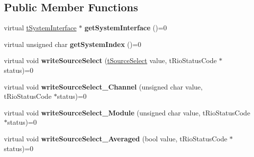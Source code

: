 \subsection*{Public Member Functions}
\begin{DoxyCompactItemize}
\item 
\hypertarget{classnFPGA_1_1nFRC__2012__1__6__4_1_1tAnalogTrigger_a314fa4ff3c023d2de8503a0b93340bd9}{
virtual \hyperlink{classnFPGA_1_1tSystemInterface}{tSystemInterface} $\ast$ {\bfseries getSystemInterface} ()=0}
\label{classnFPGA_1_1nFRC__2012__1__6__4_1_1tAnalogTrigger_a314fa4ff3c023d2de8503a0b93340bd9}

\item 
\hypertarget{classnFPGA_1_1nFRC__2012__1__6__4_1_1tAnalogTrigger_a52fd7aab1c07a98e846da8d71e36a84f}{
virtual unsigned char {\bfseries getSystemIndex} ()=0}
\label{classnFPGA_1_1nFRC__2012__1__6__4_1_1tAnalogTrigger_a52fd7aab1c07a98e846da8d71e36a84f}

\item 
\hypertarget{classnFPGA_1_1nFRC__2012__1__6__4_1_1tAnalogTrigger_ac5c2891b2d6250fa5fca37d2a5b8557b}{
virtual void {\bfseries writeSourceSelect} (\hyperlink{unionnFPGA_1_1nFRC__2012__1__6__4_1_1tAnalogTrigger_1_1tSourceSelect}{tSourceSelect} value, tRioStatusCode $\ast$status)=0}
\label{classnFPGA_1_1nFRC__2012__1__6__4_1_1tAnalogTrigger_ac5c2891b2d6250fa5fca37d2a5b8557b}

\item 
\hypertarget{classnFPGA_1_1nFRC__2012__1__6__4_1_1tAnalogTrigger_a5b716925d6169680c6a0448c5809dca0}{
virtual void {\bfseries writeSourceSelect\_\-Channel} (unsigned char value, tRioStatusCode $\ast$status)=0}
\label{classnFPGA_1_1nFRC__2012__1__6__4_1_1tAnalogTrigger_a5b716925d6169680c6a0448c5809dca0}

\item 
\hypertarget{classnFPGA_1_1nFRC__2012__1__6__4_1_1tAnalogTrigger_a9eadad9a603d0171e92c1f6758b31e8e}{
virtual void {\bfseries writeSourceSelect\_\-Module} (unsigned char value, tRioStatusCode $\ast$status)=0}
\label{classnFPGA_1_1nFRC__2012__1__6__4_1_1tAnalogTrigger_a9eadad9a603d0171e92c1f6758b31e8e}

\item 
\hypertarget{classnFPGA_1_1nFRC__2012__1__6__4_1_1tAnalogTrigger_ae6574efd37539d20c6a6e14898a70560}{
virtual void {\bfseries writeSourceSelect\_\-Averaged} (bool value, tRioStatusCode $\ast$status)=0}
\label{classnFPGA_1_1nFRC__2012__1__6__4_1_1tAnalogTrigger_ae6574efd37539d20c6a6e14898a70560}


\end{DoxyCompactItemize}
